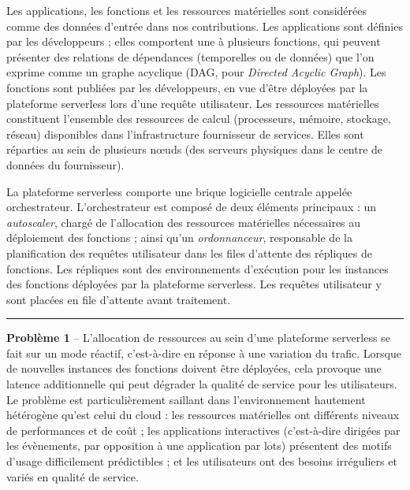 Les applications, les fonctions et les ressources matérielles sont considérées comme des données d'entrée dans nos contributions. Les applications sont définies par les développeurs ; elles comportent une à plusieurs fonctions, qui peuvent présenter des relations de dépendances (temporelles ou de données) que l'on exprime comme un graphe acyclique (\gls{DAG}, pour \textit{Directed Acyclic Graph}). Les fonctions sont publiées par les développeurs, en vue d'être déployées par la plateforme serverless lors d'une requête utilisateur. Les ressources matérielles constituent l'ensemble des ressources de calcul (processeurs, mémoire, stockage, réseau) disponibles dans l'infrastructure fournisseur de services. Elles sont réparties au sein de plusieurs nœuds (des serveurs physiques dans le centre de données du fournisseur).

La plateforme serverless comporte une brique logicielle centrale appelée orchestrateur. L'orchestrateur est composé de deux éléments principaux : un \textit{autoscaler}, chargé de l'allocation des ressources matérielles nécessaires au déploiement des fonctions ; ainsi qu'un \textit{ordonnanceur}, responsable de la planification des requêtes utilisateur dans les files d'attente des répliques de fonctions. Les répliques sont des environnements d'exécution pour les instances des fonctions déployées par la plateforme serverless. Les requêtes utilisateur y sont placées en file d'attente avant traitement.


\begin{center}
    \rule{4cm}{0.4pt}
\end{center}

\textbf{Problème 1} -- L'allocation de ressources au sein d'une plateforme serverless se fait sur un mode réactif, c'est-à-dire en réponse à une variation du trafic. Lorsque de nouvelles instances des fonctions doivent être déployées, cela provoque une latence additionnelle qui peut dégrader la qualité de service pour les utilisateurs. Le problème est particulièrement saillant dans l'environnement hautement hétérogène qu'est celui du cloud : les ressources matérielles ont différents niveaux de performances et de coût ; les applications interactives (c'est-à-dire dirigées par les évènements, par opposition à une application par lots) présentent des motifs d'usage difficilement prédictibles ; et les utilisateurs ont des besoins irréguliers et variés en qualité de service.

